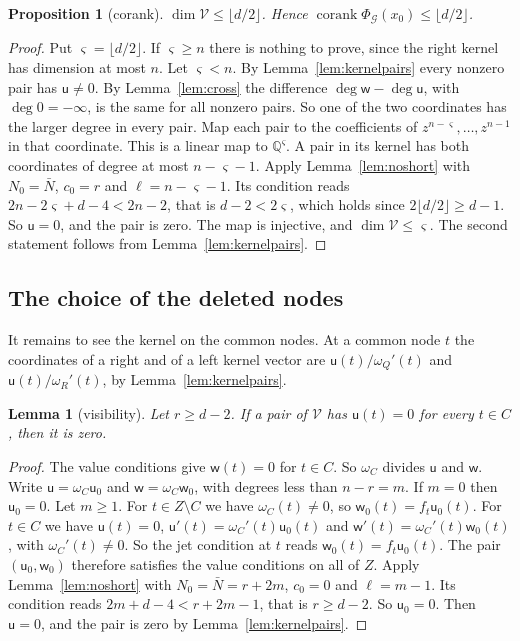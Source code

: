 \documentclass[11pt]{amsart}
\newtheorem{lemma}[theorem]{Lemma}
\newtheorem{proposition}[theorem]{Proposition}
\theoremstyle{definition}
\theoremstyle{remark}
\numberwithin{equation}{section}
\newcommand{\Q}{\mathbb Q}
\newcommand{\corank}{\operatorname{corank}}
\begin{document}
\begin{proposition}[corank]\label{prop:corank}
$\dim\mathcal V\le\lfloor d/2\rfloor$. Hence $\corank\Phi_{\mathcal G}(x_0)\le\lfloor d/2\rfloor$.
\end{proposition}
\begin{proof}
Put $\varsigma=\lfloor d/2\rfloor$. If $\varsigma\ge n$ there is nothing to prove, since the right kernel has dimension
at most $n$. Let $\varsigma<n$. By Lemma~\ref{lem:kernelpairs} every nonzero pair has $\mathsf u\ne0$. By
Lemma~\ref{lem:cross} the difference $\deg\mathsf w-\deg\mathsf u$, with $\deg0=-\infty$, is the same for all nonzero
pairs. So one of the two coordinates has the larger degree in every pair. Map each pair to the
coefficients of $z^{n-\varsigma},\dots,z^{n-1}$ in that coordinate. This is a linear map to $\Q^\varsigma$. A pair in its
kernel has both coordinates of degree at most $n-\varsigma-1$. Apply Lemma~\ref{lem:noshort} with $N_0=\bar N$,
$c_0=r$ and $\ell=n-\varsigma-1$. Its condition reads $2n-2\varsigma+d-4<2n-2$, that is $d-2<2\varsigma$, which holds
since $2\lfloor d/2\rfloor\ge d-1$. So $\mathsf u=0$, and the pair is zero. The map is injective, and
$\dim\mathcal V\le\varsigma$. The second statement follows from Lemma~\ref{lem:kernelpairs}.
\end{proof}

\subsection{The choice of the deleted nodes}\label{ssec:nvgeneral}
It remains to see the kernel on the common nodes. At a common node $t$ the coordinates of a right and of a left kernel
vector are $\mathsf u(t)/\omega_Q'(t)$ and $\mathsf u(t)/\omega_R'(t)$, by Lemma~\ref{lem:kernelpairs}.

\begin{lemma}[visibility]\label{lem:visible}
Let $r\ge d-2$. If a pair of $\mathcal V$ has $\mathsf u(t)=0$ for every $t\in C$, then it is zero.
\end{lemma}
\begin{proof}
The value conditions give $\mathsf w(t)=0$ for $t\in C$. So $\omega_C$ divides $\mathsf u$ and $\mathsf w$. Write
$\mathsf u=\omega_C\mathsf u_0$ and $\mathsf w=\omega_C\mathsf w_0$, with degrees less than $n-r=m$. If $m=0$ then
$\mathsf u_0=0$. Let $m\ge1$. For $t\in Z\setminus C$ we have $\omega_C(t)\ne0$, so $\mathsf w_0(t)=f_t\mathsf u_0(t)$.
For $t\in C$ we have $\mathsf u(t)=0$, $\mathsf u'(t)=\omega_C'(t)\mathsf u_0(t)$ and $\mathsf w'(t)=\omega_C'(t)\mathsf
w_0(t)$, with $\omega_C'(t)\ne0$. So the jet condition at $t$ reads $\mathsf w_0(t)=f_t\mathsf u_0(t)$. The pair
$(\mathsf u_0,\mathsf w_0)$ therefore satisfies the value conditions on all of $Z$. Apply Lemma~\ref{lem:noshort} with
$N_0=\bar N=r+2m$, $c_0=0$ and $\ell=m-1$. Its condition reads $2m+d-4<r+2m-1$, that is $r\ge d-2$. So
$\mathsf u_0=0$. Then $\mathsf u=0$, and the pair is zero by Lemma~\ref{lem:kernelpairs}.
\end{proof}
\end{document}
